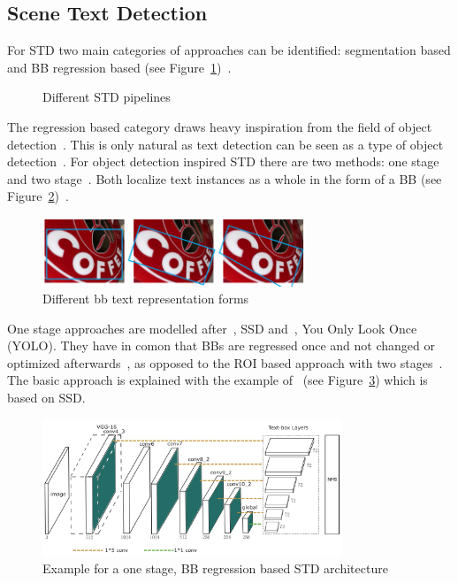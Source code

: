 \subsection{Scene Text Detection}
For \ac{STD} two main categories of approaches can be identified: segmentation based and \ac{BB}
regression based (see
Figure~\ref{fig:STD-pipelines})~\citep{long_scene_2021,sheng_centripetaltext_2021,liu_accurate_2020}.
\begin{figure}[ht]
    \centering
    
    \caption{Different STD pipelines\label{fig:STD-pipelines}}
\end{figure}
The regression based category draws heavy inspiration from the field of object
detection~\citep{long_scene_2021,liu_accurate_2020}.
This is only natural as text detection can be seen as a type of object
detection~\citep{liu_accurate_2020,long_scene_2021}.
For object detection inspired \ac{STD} there are two methods: one stage and two
stage~\citep{long_scene_2021}.
Both localize text instances as a whole in the form of a
\ac{BB} (see Figure~\ref{fig:STD-BB})~\citep{long_scene_2021,sheng_centripetaltext_2021}.
\begin{figure}[h]
    \centering
    \includegraphics[width=0.7\textwidth]{img/STD-representation-BB-Liao-Textsnake-2018.png}
    \caption[Different bb text representation forms]{%
        Different bb text representation forms~\citep{ferrari_textsnake_2018}\label{fig:STD-BB}
    }
\end{figure}
One stage approaches are modelled after~\cite{liu_ssd_2016}, \ac{SSD} and~\cite{redmon_you_2016},
You Only Look Once (YOLO).
They have in comon that \acp{BB} are regressed once and not changed or optimized
afterwards~\citep{redmon_you_2016,liu_ssd_2016}, as opposed to the \ac{ROI} based approach with two
stages~\citep{girshick_rich_2014}.
The basic approach is explained with the example of~\cite{liao_textboxes_2017} (see
Figure~\ref{fig:STD-segfree-ssd}) which is based on \ac{SSD}.
\begin{figure}[ht]
    \centering
    \includegraphics[width=0.8\textwidth]{img/STD-seg-free-Liao-TextBoxes-2017.png}
    \caption[One stage, BB regression based STD architecture]{%
        Example for a one stage, BB regression based STD
        architecture~\citep{liao_textboxes_2017}\label{fig:STD-segfree-ssd}
    }
\end{figure}
